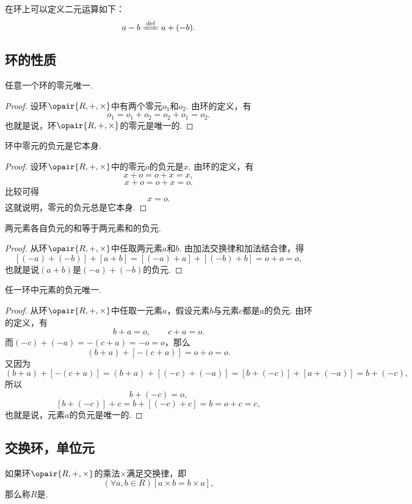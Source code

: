 在环上可以定义二元运算如下：\[
    a - b \defeq a + (-b).
\]

\subsection{环的性质}
\begin{property}
任意一个环的零元唯一.
\begin{proof}
设环\(\opair{R,+,\times}\)中有两个零元\(o_1\)和\(o_2\).
由环的定义，有\[
    o_1 = o_1 + o_2 = o_2 + o_1 = o_2.
\]
也就是说，环\(\opair{R,+,\times}\)的零元是唯一的.
\end{proof}
\end{property}

\begin{property}
环中零元的负元是它本身.
\begin{proof}
设环\(\opair{R,+,\times}\)中的零元\(o\)的负元是\(x\).
由环的定义，有\[
    x + o = o + x = x,
\]\[
    x + o = o + x = o.
\]比较可得\[
    x = o.
\]
这就说明，零元的负元总是它本身.
\end{proof}
\end{property}

\begin{property}
两元素各自负元的和等于两元素和的负元.
\begin{proof}
从环\(\opair{R,+,\times}\)中任取两元素\(a\)和\(b\).
由加法交换律和加法结合律，得\[
    [(-a) + (-b)] + [a + b]
    = [(-a) + a] + [(-b) + b]
    = o + o = o,
\]
也就是说\((a+b)\)是\((-a) + (-b)\)的负元.
\end{proof}
\end{property}

\begin{property}
任一环中元素的负元唯一.
\begin{proof}
从环\(\opair{R,+,\times}\)中任取一元素\(a\)，假设元素\(b\)与元素\(c\)都是\(a\)的负元.
由环的定义，有\[
    b + a = o, \qquad
    c + a = o.
\]
而\((-c) + (-a) = -(c + a) = -o = o\)，那么\[
    (b + a) + [-(c + a)]
    = o + o = o.
\]又因为\[
    (b + a) + [-(c + a)]
    = (b + a) + [(-c) + (-a)]
    = [b + (-c)] + [a + (-a)]
    = b + (-c),
\]所以\[
    b + (-c) = o,
\]\[
    [b + (-c)] + c = b + [(-c) + c] = b = o + c = c,
\]
也就是说，元素\(a\)的负元是唯一的.
\end{proof}
\end{property}

\subsection{交换环，单位元}
\begin{definition}
如果环\(\opair{R,+,\times}\)的乘法\(\times\)满足交换律，即\[
	(\forall a,b \in R)[a \times b = b \times a],
\]
那么称\(R\)是.
\end{definition}

